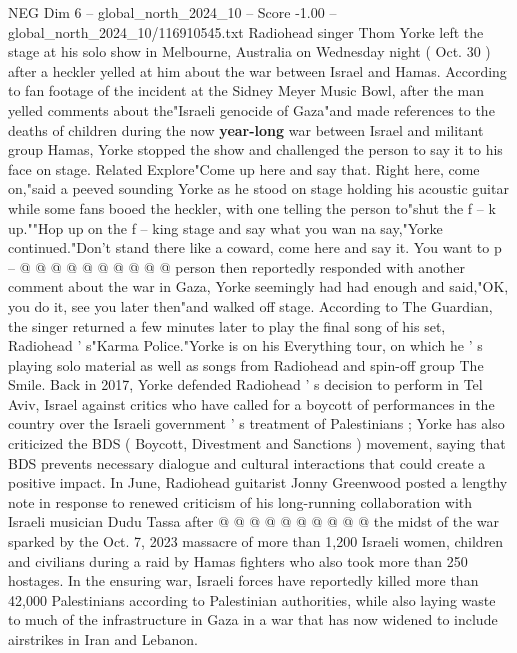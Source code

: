 \begin{textsample}{NEG Dim 6 – global\_north\_2024\_10 – Score -1.00 – global\_north\_2024\_10/116910545.txt}  \label{ex:f6_neg_050}
Radiohead singer Thom Yorke left the stage at his solo show in Melbourne, Australia on Wednesday night ( Oct. 30 ) after a heckler yelled at him about the war between Israel and Hamas.
According to fan footage of the incident at the Sidney Meyer Music Bowl, after the man yelled comments about the"Israeli genocide of Gaza"and made references to the deaths of children during the now \textbf{year-long} war between Israel and militant group Hamas, Yorke stopped the show and challenged the person to say it to his face on stage.
Related Explore"Come up here and say that.
Right here, come on,"said a peeved sounding Yorke as he stood on stage holding his acoustic guitar while some fans booed the heckler, with one telling the person to"shut the f -- k up.""Hop up on the f -- king stage and say what you wan na say,"Yorke continued."Don't stand there like a coward, come here and say it.
You want to p -- @ @ @ @ @ @ @ @ @ @ person then reportedly responded with another comment about the war in Gaza, Yorke seemingly had had enough and said,"OK, you do it, see you later then"and walked off stage.
According to The Guardian, the singer returned a few minutes later to play the final song of his set, Radiohead ' s"Karma Police."Yorke is on his Everything tour, on which he ' s playing solo material as well as songs from Radiohead and spin-off group The Smile.
Back in 2017, Yorke defended Radiohead ' s decision to perform in Tel Aviv, Israel against critics who have called for a boycott of performances in the country over the Israeli government ' s treatment of Palestinians ; Yorke has also criticized the BDS ( Boycott, Divestment and Sanctions ) movement, saying that BDS prevents necessary dialogue and cultural interactions that could create a positive impact.
In June, Radiohead guitarist Jonny Greenwood posted a lengthy note in response to renewed criticism of his long-running collaboration with Israeli musician Dudu Tassa after @ @ @ @ @ @ @ @ @ @ the midst of the war sparked by the Oct. 7, 2023 massacre of more than 1,200 Israeli women, children and civilians during a raid by Hamas fighters who also took more than 250 hostages.
In the ensuring war, Israeli forces have reportedly killed more than 42,000 Palestinians according to Palestinian authorities, while also laying waste to much of the infrastructure in Gaza in a war that has now widened to include airstrikes in Iran and Lebanon.

\end{textsample}
